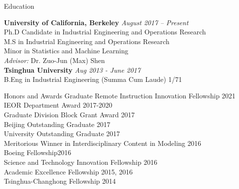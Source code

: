 \documentclass{resume} %
\begin{document}

\begin{rSection}{Education}

{\bf University of California, Berkeley} \hfill {\em August 2017 -- Present} 
\\ Ph.D Candidate in Industrial Engineering and Operations Research \hfill 
\\ M.S in Industrial Engineering and Operations Research
\\ Minor in Statistics and Machine Learning
\\ {\textit{Advisor:} Dr. Zuo-Jun (Max) Shen} 
\\{\bf Tsinghua University} \hfill {\em Aug 2013 - June 2017} 
\\ B.Eng in Industrial Engineering (Summa Cum Laude) \hfill { 1/71 }
\end{rSection}

\begin{rSection}{Honors and Awards}
Graduate Remote Instruction Innovation Fellowship \hfill {2021}\\
IEOR Department Award \hfill {2017-2020}\\
Graduate Division Block Grant Award \hfill {2017}\\
Beijing Outstanding Graduate \hfill {2017}\\
University Outstanding Graduate \hfill {2017}\\
Meritorious Winner in Interdisciplinary Content in Modeling  \hfill {2016}\\
Boeing Fellowship\hfill {2016}\\
Science and Technology Innovation Fellowship \hfill {2016}\\
Academic Excellence Fellowship \hfill {2015, 2016}\\
Tsinghua-Changhong Fellowship \hfill{2014}
\end{rSection}
\end{document}
